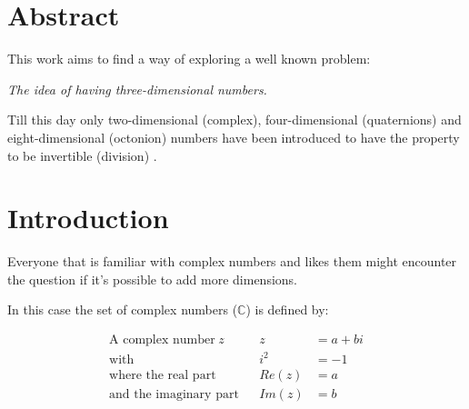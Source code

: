 \documentclass[a4paper,english,parskip]{scrartcl}
\begin{document}
	\onehalfspacing
	
	
	
	\tableofcontents
	
	\newpage
	\section{Abstract}
	
	This work aims to find a way of exploring a well known problem: 
	
	\begin{center}
	\textit{The idea of having three-dimensional numbers.  }
	\end{center}
	
	Till this day only two-dimensional (complex),  four-dimensional (quaternions) and eight-dimensional
	(octonion) numbers have been introduced to have the property to be invertible (division) \cite{article:100}.
	
	\newpage
	\section{Introduction}
	
	Everyone that is familiar with complex numbers and likes them might encounter the question if it's possible 
	to add more dimensions.
	
	In this case the set of complex numbers ($\mathbb{C}$) is defined by:
	
	\begin{tcolorbox}
	\vspace{-17pt}
	\begin{align*}
	\text{A complex number} \hspace{3pt} z && z &= a + bi \\
	\text{with} && i^2 &= -1 \\
	\text{where the real part} && Re(z) &= a \\
	\text{and the imaginary part} && Im(z) &= b 
	\end{align*}
	\end{tcolorbox}
	
\end{document}
